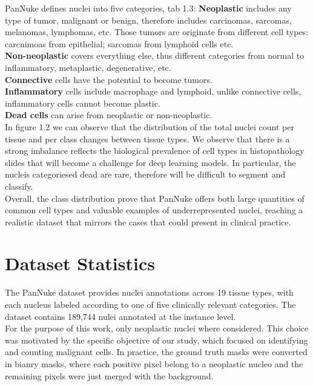 \documentclass[target=bach,aauheader=,style=]{thud}
\begin{document}
PanNuke defines nuclei into five categories, tab 1.3: \textbf{Neoplastic} includes any type of tumor, malignant or benign, therefore includes carcinomas, sarcomas, melanomas, lymphomas, etc. Those tumors are originate from different cell types: carcnimoas from epithelial; sarcomas from lymphoid cells etc.\\
\textbf{Non-neoplastic} covers everything else, thus different categories from normal to inflammatory, metaplastic, degenerative, etc.\\
\textbf{Connective} cells have the potential to become tumors.\\
\textbf{Inflammatory} cells include macrophage and lymphoid, unlike connective cells, inflammatory cells cannot become plastic.\\
\textbf{Dead cells} can arise from neoplastic or non-neoplastic.\\

In figure 1.2 we can observe that the distribution of the total nuclei count per tissue and per class changes between tissue types. We observe that there is a strong imbalance reflects the biological prevalence of cell types in histopathology slides that will become a challenge for deep learning models. In particular, the nucleis categoriesed dead are rare, therefore will be difficult to segment and classify.\\
Overall, the class distribution prove that PanNuke offers both large quantities of common cell types and valuable examples of underrepresented nuclei, reaching a realistic dataset that mirrors the cases that could present in clinical practice.

\section{Dataset Statistics}
The PanNuke dataset provides nuclei annotations across 19 tissue types, with each nucleus labeled according to one of five clinically relevant categories. The dataset contains 189,744 nulei annotated at the instance level.\\
For the purpose of this work, only neoplastic nuclei where considered. This choice was motivated by the specific objective of our study, which focused on identifying and counting malignant cells. In practice, the ground truth masks were converted in bianry masks, where each positive pixel belong to a neoplastic nucleo and the remaining pixels were just merged with the background.\\
\end{document}
